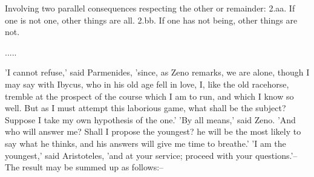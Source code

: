      Involving two parallel consequences respecting the other or remainder:
     2.aa.  If one is not one, other things are all.
     2.bb.  If one has not being, other things are not.


.....

'I cannot refuse,' said Parmenides, 'since, as Zeno remarks, we are
alone, though I may say with Ibycus, who in his old age fell in love, I,
like the old racehorse, tremble at the prospect of the course which I am
to run, and which I know so well. But as I must attempt this laborious
game, what shall be the subject? Suppose I take my own hypothesis of
the one.' 'By all means,' said Zeno. 'And who will answer me? Shall I
propose the youngest? he will be the most likely to say what he thinks,
and his answers will give me time to breathe.' 'I am the youngest,' said
Aristoteles, 'and at your service; proceed with your questions.'--The
result may be summed up as follows:--

